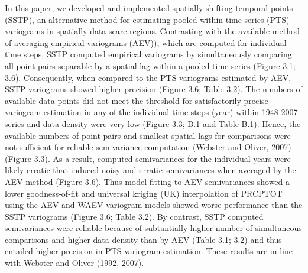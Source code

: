In this paper, we developed and implemented spatially shifting temporal points (SSTP), an alternative method for estimating pooled within-time series (PTS) variograms in spatially data-scare regions. Contrasting with the available method of averaging empirical variograms (AEV)), which are computed for individual time steps, SSTP computed empirical variograms by simultaneously comparing all point pairs separable by a spatial-lag within a pooled time series (Figure 3.1; 3.6). Consequently, when compared to the PTS variograms estimated by AEV, SSTP variograms showed higher precision (Figure 3.6; Table 3.2). The numbers of available data points did not meet the threshold for satisfactorily precise variogram estimation in any of the individual time steps (year) within 1948-2007 series and data density were very low (Figure 3.3; B.1 and Table B.1). Hence, the available numbers of point pairs and smallest spatial-lags for comparisons were not sufficient for reliable semivariance computation (Webster and Oliver, 2007) (Figure 3.3). As a result, computed semivariances for the individual years were likely erratic that induced noisy and erratic semivariances when averaged by the AEV method (Figure 3.6). Thus model fitting to AEV semivariances showed a lower goodness-of-fit and universal kriging (UK) interpolation of PRCPTOT using the AEV and WAEV variogram models showed worse performance than the SSTP variograms (Figure 3.6; Table 3.2). By contrast, SSTP computed semivariances were reliable because of subtantially higher number of simultaneous comparisons and higher data density than by AEV (Table 3.1; 3.2) and thus entailed higher precision in PTS variogram estimation. These results are in line with Webster and Oliver (1992, 2007).

